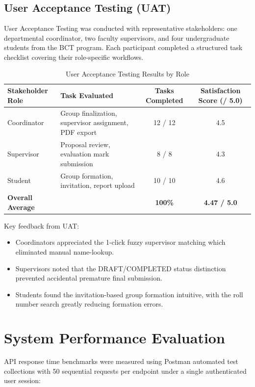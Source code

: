 \subsection{User Acceptance Testing (UAT)}
User Acceptance Testing was conducted with representative stakeholders: one departmental coordinator, two faculty supervisors, and four undergraduate students from the BCT program. Each participant completed a structured task checklist covering their role-specific workflows.

\begin{table}[H]
\centering
\small
\caption{User Acceptance Testing Results by Role}
\label{tab:uat}
\vspace{6pt}
\begin{tabularx}{\textwidth}{|l|X|c|c|}
\hline
\textbf{Stakeholder Role} & \textbf{Task Evaluated} & \textbf{Tasks Completed} & \textbf{Satisfaction Score (/ 5.0)} \\
\hline
Coordinator & Group finalization, supervisor assignment, PDF export & 12 / 12 & 4.5 \\
Supervisor & Proposal review, evaluation mark submission & 8 / 8 & 4.3 \\
Student & Group formation, invitation, report upload & 10 / 10 & 4.6 \\
\hline
\textbf{Overall Average} & & \textbf{100\%} & \textbf{4.47 / 5.0} \\
\hline
\end{tabularx}
\end{table}

Key feedback from UAT:
\begin{itemize}
    \item Coordinators appreciated the 1-click fuzzy supervisor matching which eliminated manual name-lookup.
    \item Supervisors noted that the DRAFT/COMPLETED status distinction prevented accidental premature final submission.
    \item Students found the invitation-based group formation intuitive, with the roll number search greatly reducing formation errors.
\end{itemize}

\section{System Performance Evaluation}

API response time benchmarks were measured using Postman automated test collections with 50 sequential requests per endpoint under a single authenticated user session:

